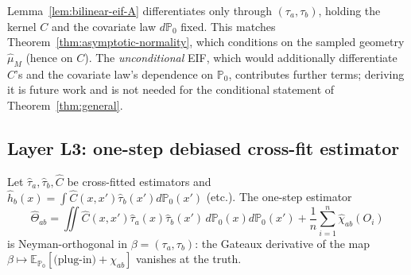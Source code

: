 \begin{remark}
\label{rem:kernel-dependence}
Lemma~\ref{lem:bilinear-eif-A} differentiates only through $(\tau_a,\tau_b)$, holding the
kernel $C$ and the covariate law $d\mathbb{P}_0$ fixed. This matches
Theorem~\ref{thm:asymptotic-normality}, which conditions on the sampled geometry $\hat{\mu}_M$
(hence on $C$). The \emph{unconditional} EIF, which would additionally differentiate $C$'s and
the covariate law's dependence on $\mathbb{P}_0$, contributes further terms; deriving it is
future work and is not needed for the conditional statement of Theorem~\ref{thm:general}.
\end{remark}

\subsection{Layer L3: one-step debiased cross-fit estimator}

\begin{lemma}
\label{lem:onestep-A}
Let $\hat\tau_a,\hat\tau_b,\hat{C}$ be cross-fitted estimators and
$\hat h_b(x)=\int \hat C(x,x')\hat\tau_b(x')d\mathbb{P}_0(x')$ (etc.). The one-step estimator
\begin{equation}
\hat\Theta_{ab}
 = \iint \hat C(x,x')\hat\tau_a(x)\hat\tau_b(x')\,d\mathbb{P}_0(x)d\mathbb{P}_0(x')
 + \frac{1}{n}\sum_{i=1}^n \hat\chi_{ab}(O_i)
\label{eq:onestep}
\end{equation}
is Neyman-orthogonal in $\beta=(\tau_a,\tau_b)$: the Gateaux derivative of the map
$\beta\mapsto \mathbb{E}_{\mathbb{P}_0}[\text{(plug-in)}+\chi_{ab}]$ vanishes at the truth.
\end{lemma}

